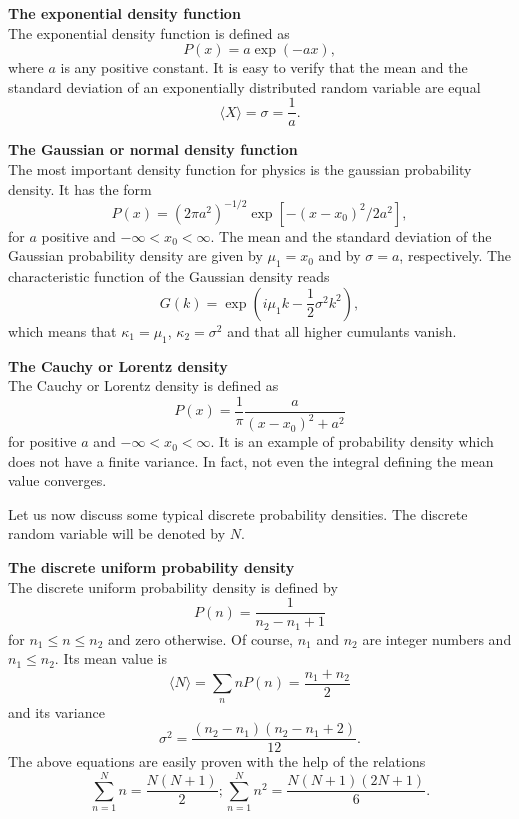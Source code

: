 {\bf The exponential density function} \\
The exponential density function is defined as
\begin{equation}
P(x) = a \exp(-ax),
\end{equation}
where $a$ is any positive constant. It is easy to verify that
the mean and the standard deviation of an exponentially distributed random 
variable are equal
\begin{equation}
\langle X \rangle = \sigma = \frac{1}{a}.
\end{equation}

{\bf  The Gaussian or normal density function}\\
The most important density function for physics is the 
gaussian probability density. It has the form
\begin{equation}
P(x) = (2\pi a^2)^{-1/2} \exp[-(x-x_0)^2/2a^2],
\end{equation}
for $a$ positive and $-\infty < x_0 < \infty$.
The mean and the standard deviation of the Gaussian probability 
density are given by $\mu_1 = x_0$ and by $\sigma =a$, 
respectively. The characteristic function of the Gaussian density reads
\begin{equation}
G(k) = \exp(i \mu_1k - \frac{1}{2} \sigma^2 k^2),
\end{equation} 
which means that $\kappa_1 = \mu_1$, $\kappa_2 = \sigma^2$ and 
that all higher cumulants vanish.

{\bf The Cauchy or Lorentz density} \\
The Cauchy or Lorentz density is defined as
\begin{equation}
P(x) = \frac{1}{\pi} \frac{a}{(x-x_0)^2 + a^2}
\end{equation}
for positive $a$ and $-\infty <x_0 < \infty$. It is an example of
probability density which does not have a finite variance. In 
fact, not even the integral defining  the mean value converges. 

Let us now discuss some typical discrete probability densities.
The discrete random variable will be denoted by $N$.

{\bf The discrete uniform probability density} \\
The discrete uniform probability density is defined by
\begin{equation}
P(n) = \frac{1}{n_2 -n_1 +1}
\end{equation}
for $n_1 \le n \le n_2$ and zero otherwise. Of course,
$n_1$ and $n_2$ are integer numbers and $n_1 \le n_2$.
Its mean value is
\begin{equation}
\langle N \rangle = \sum_n n P(n) = \frac{n_1 +n_2}{2} 
\end{equation}
and its variance
\begin{equation}
\sigma^2 = \frac{(n_2 -n_1)(n_2 -n_1+2)}{12}.
\end{equation}
The above equations are easily proven with the help of the 
relations
\begin{equation}
\sum_{n=1}^N n= \frac{N(N+1)}{2}; \sum_{n=1}^{N} n^2 = \frac{N(N+1)(2N+1)}{6}. 
\end{equation}

